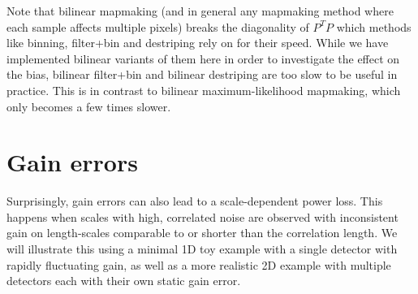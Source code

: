 \documentclass[twocolumn,apj]{aastex63}
\begin{document}
Note that bilinear mapmaking (and in general any mapmaking method where each sample
affects multiple pixels) breaks the diagonality of $P^TP$ which methods like binning,
filter+bin and destriping rely on for their speed. While we have implemented bilinear
variants of them here in order to investigate the effect on the bias, bilinear filter+bin
and bilinear destriping are too slow to be useful in practice. This is in contrast to
bilinear maximum-likelihood mapmaking, which only becomes a few times slower.

\section{Gain errors}
Surprisingly, gain errors can also lead to a scale-dependent power loss.
This happens when scales with high, correlated noise are observed with
inconsistent gain on length-scales comparable to or shorter than the
correlation length. We will illustrate this using a minimal 1D toy example
with a single detector with rapidly fluctuating gain, as well as a more
realistic 2D example with multiple detectors each with their own static
gain error.
\end{document}
